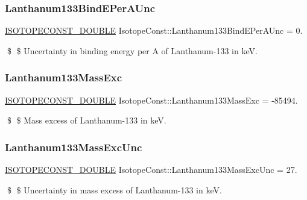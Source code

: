 \subsubsection{\texorpdfstring{Lanthanum133\+Bind\+E\+Per\+A\+Unc}{Lanthanum133BindEPerAUnc}}
{\footnotesize\ttfamily \mbox{\hyperlink{group___isotope_const-_macros_ga8f45a7272ce02c0b4c65c44636ed719a}{I\+S\+O\+T\+O\+P\+E\+C\+O\+N\+S\+T\+\_\+\+D\+O\+U\+B\+LE}} Isotope\+Const\+::\+Lanthanum133\+Bind\+E\+Per\+A\+Unc = 0.}

\$ \$ Uncertainty in binding energy per A of Lanthanum-\/133 in keV. \mbox{\label{group___isotope_const-_lanthanum-_la133_gaf9873c4141bfacb54bbe61fae2e2a6bd}} 
\subsubsection{\texorpdfstring{Lanthanum133\+Mass\+Exc}{Lanthanum133MassExc}}
{\footnotesize\ttfamily \mbox{\hyperlink{group___isotope_const-_macros_ga8f45a7272ce02c0b4c65c44636ed719a}{I\+S\+O\+T\+O\+P\+E\+C\+O\+N\+S\+T\+\_\+\+D\+O\+U\+B\+LE}} Isotope\+Const\+::\+Lanthanum133\+Mass\+Exc = -\/85494.}

\$ \$ Mass excess of Lanthanum-\/133 in keV. \mbox{\label{group___isotope_const-_lanthanum-_la133_ga1207ca85d7c723156b72abae86908780}} 
\subsubsection{\texorpdfstring{Lanthanum133\+Mass\+Exc\+Unc}{Lanthanum133MassExcUnc}}
{\footnotesize\ttfamily \mbox{\hyperlink{group___isotope_const-_macros_ga8f45a7272ce02c0b4c65c44636ed719a}{I\+S\+O\+T\+O\+P\+E\+C\+O\+N\+S\+T\+\_\+\+D\+O\+U\+B\+LE}} Isotope\+Const\+::\+Lanthanum133\+Mass\+Exc\+Unc = 27.}

\$ \$ Uncertainty in mass excess of Lanthanum-\/133 in keV. \mbox{\label{group___isotope_const-_lanthanum-_la133_ga9f442e7478f44e900f2dde6e0f5bf8f2}} 
